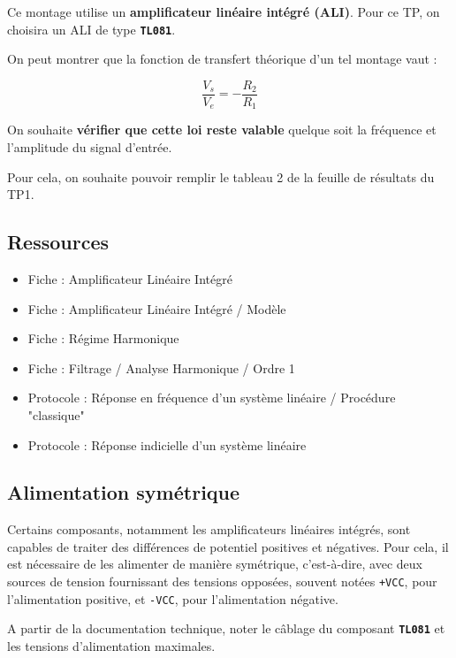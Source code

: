 Ce montage utilise un \textbf{amplificateur linéaire intégré (ALI)}. Pour ce TP, on choisira un ALI de type \textbf{\texttt{TL081}}.

\medskip

On peut montrer que la fonction de transfert théorique d'un tel montage vaut :

\[
\boxed{\frac{V_s}{V_e} = - \frac{R_2}{R_1}}
\]

\medskip

On souhaite \textbf{vérifier que cette loi reste valable} quelque soit la fréquence et l'amplitude du signal d'entrée.

\medskip

Pour cela, on souhaite pouvoir remplir le tableau 2 de la feuille de résultats du TP1.



\subsection{Ressources}

\begin{itemize}
	\item Fiche : Amplificateur Linéaire Intégré
	\item Fiche : Amplificateur Linéaire Intégré / Modèle
	\item Fiche : Régime Harmonique
	\item Fiche : Filtrage / Analyse Harmonique / Ordre 1
	\item Protocole : Réponse en fréquence d'un système linéaire / Procédure "classique"
	\item Protocole : Réponse indicielle d'un système linéaire
\end{itemize}


\clearpage
\subsection{Alimentation symétrique}
Certains composants, notamment les amplificateurs linéaires intégrés, sont capables de traiter des différences de potentiel positives et négatives. Pour cela, il est nécessaire de les alimenter de manière symétrique, c'est-à-dire, avec deux sources de tension fournissant des tensions opposées, souvent notées \texttt{+VCC}, pour l'alimentation positive, et \texttt{-VCC}, pour l'alimentation négative. 

\Quest A partir de la documentation technique, noter le câblage du composant \textbf{\texttt{TL081}} et les tensions d'alimentation maximales. 

